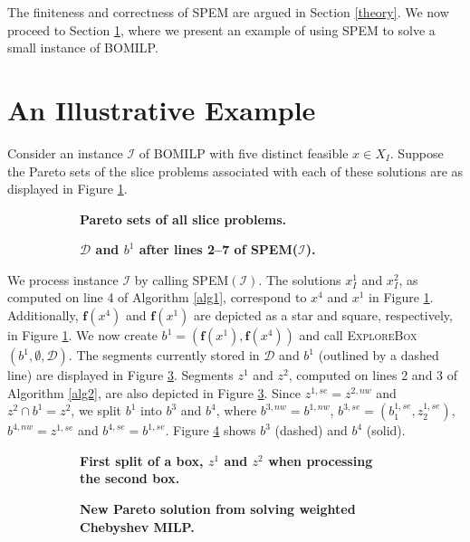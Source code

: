 \documentclass[12pt]{article}
\newcommand{\objf}{\boldsymbol{f}}
\begin{document}
The finiteness and correctness of SPEM are argued in Section \ref{theory}. We now proceed to Section \ref{example}, where we present an example of using SPEM to solve a small instance of BOMILP. 

\section{An Illustrative Example}\label{example}

Consider an instance $\mathcal{I}$ of BOMILP with five distinct feasible $x \in X_I$. Suppose the Pareto sets of the slice problems associated with each of these solutions are as displayed in Figure \ref{fig_ex_1}.
\begin{figure}[h!]
\begin{subfigure}[h]{.2\textwidth}
\centering
\caption{\textbf{Pareto sets of all slice problems.}}\label{fig_ex_1}
\end{subfigure}\hfill%
\begin{subfigure}[h]{.2\textwidth}
\centering
\caption{\textbf{$\mathcal{D}$ and $b^1$ after lines 2--7 of \textsc{SPEM}($\mathcal{I}$).}}\label{fig_ex_2}
\end{subfigure}
\caption{}
\end{figure}
We process instance $\mathcal{I}$ by calling \textsc{SPEM}$(\mathcal{I})$. The solutions $x_I^1$ and $x_I^2$, as computed on line 4 of Algorithm \ref{alg1}, correspond to $x^4$ and $x^1$ in Figure \ref{fig_ex_1}. Additionally, $\objf(x^4)$ and $\objf(x^1)$ are depicted as a star and square, respectively, in Figure \ref{fig_ex_1}. We now create $b^1 = (\objf(x^1),\objf(x^4))$ and call \textsc{ExploreBox}$(b^1,\emptyset,\mathscr{D})$. The segments currently stored in $\mathscr{D}$ and $b^1$ (outlined by a dashed line) are displayed in Figure \ref{fig_ex_2}. Segments $z^1$ and $z^2$, computed on lines 2 and 3 of Algorithm \ref{alg2}, are also depicted in Figure \ref{fig_ex_2}. Since $z^{1,se} = z^{2,nw}$ and $z^2 \cap b^1 = z^2$, we split $b^1$ into $b^3$ and $b^4$, where $b^{3,nw} = b^{1,nw}$,  $b^{3,se} = (b^{1,se}_1,z^{1,se}_2)$, $b^{4,nw} = z^{1,se}$ and $b^{4,se} = b^{1,se}$. Figure \ref{fig_ex_3} shows $b^3$ (dashed) and $b^4$ (solid). 
\begin{figure}[h!]
\begin{subfigure}[h]{.2\textwidth}
\centering
\caption{\textbf{First split of a box, $z^1$ and $z^2$ when processing the second box.}}\label{fig_ex_3}
\end{subfigure}\hfill%
\begin{subfigure}[h]{.2\textwidth}
\centering
\caption{\textbf{New Pareto solution from solving weighted Chebyshev MILP.}}\label{fig_ex_4}
\end{subfigure}
\caption{}
\end{figure}
\end{document}
